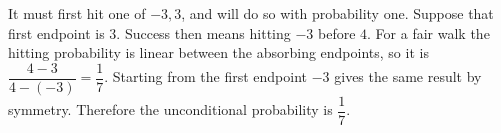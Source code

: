 It must first hit one of $-3,3$, and will do so with probability one. Suppose that first endpoint is $3$. Success then means hitting $-3$ before $4$. For a fair walk the hitting probability is linear between the absorbing endpoints, so it is $\dfrac{4-3}{4-(-3)}=\dfrac{1}{7}$. Starting from the first endpoint $-3$ gives the same result by symmetry. Therefore the unconditional probability is $\boxed{\dfrac{1}{7}}$.

